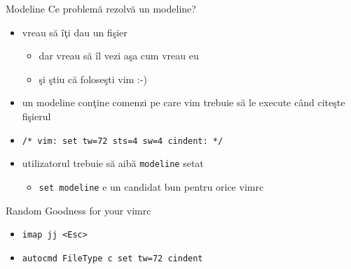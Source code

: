 \documentclass{beamer}
\begin{document}
\begin{frame}{Modeline}
Ce problemă rezolvă un modeline?
\begin{itemize}
  \item<1-> vreau să îţi dau un fişier
    \begin{itemize}
    \item<2-> dar vreau să îl vezi aşa cum vreau eu
    \item<3-> şi ştiu că foloseşti vim :-)
    \end{itemize}
  \item<4-> un modeline conţine comenzi pe care vim trebuie să le execute când
  citeşte fişierul
  \item<5-> \texttt{/* vim: set tw=72 sts=4 sw=4 cindent: */}
  \item<6-> utilizatorul trebuie să aibă \texttt{modeline} setat
    \begin{itemize}
    \item<7-> \texttt{set modeline} e un candidat bun pentru orice vimrc
    \end{itemize}
\end{itemize}
\end{frame}

\begin{frame}{Random Goodness for your vimrc}
\begin{itemize}
  \item<1-> \texttt{imap jj <Esc>}
  \item<2-> \texttt{autocmd FileType c 	set tw=72 cindent}
\end{itemize}
\end{frame}


\end{document}
